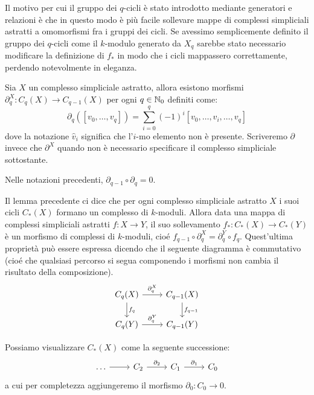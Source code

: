 \begin{rmk}
  Il motivo per cui il gruppo dei $q$-cicli è stato introdotto mediante generatori e relazioni è che in questo modo è più facile sollevare mappe di complessi simpliciali astratti a omomorfismi fra i gruppi dei cicli. Se avessimo semplicemente definito il gruppo dei $q$-cicli come il $k$-modulo generato da $X_q$ sarebbe stato necessario modificare la definizione di $f_*$ in modo che i cicli mappassero correttamente, perdendo notevolmente in eleganza.
\end{rmk}

\begin{defn}
  Sia $X$ un complesso simpliciale astratto, allora esistono morfismi $\partial^X_q:C_q(X) \to C_{q-1}(X)$ per ogni $q\in\mathbb{N}_0$ definiti come:
  \begin{equation*}
    \partial_q([v_0,\dots,v_q])=\sum_{i=0}^q (-1)^i[v_0,\dots,\widehat{v}_i,\dots,v_q]
  \end{equation*}
  dove la notazione $\widehat{v}_i$ significa che l'$i$-mo elemento non è presente. Scriveremo $\partial$ invece che $\partial^X$ quando non è necessario specificare il complesso simpliciale sottostante.
\end{defn}

\begin{lemma}
  Nelle notazioni precedenti, $\partial_{q-1}\circ \partial_q=0$.
\end{lemma}

\begin{rmk}
  Il lemma precedente ci dice che per ogni complesso simpliciale astratto $X$ i suoi cicli $C_*(X)$ formano un complesso di $k$-moduli. Allora data una mappa di complessi simpliciali astratti $f:X\to Y$, il suo sollevamento $f_*:C_*(X)\to C_*(Y)$ è un morfismo di complessi di $k$-moduli, cioé $f_{q-1}\circ \partial^X_q=\partial^Y_q\circ f_q$. Quest'ultima proprietà può essere espressa dicendo che il seguente diagramma è commutativo (cioé che qualsiasi percorso si segua componendo i morfismi non cambia il risultato della composizione).
  \begin{equation*}
    \begin{tikzcd}
      C_q(X)\arrow[r,"\partial^X_q"]\arrow[d,"f_q"]
        &C_{q-1}(X)\arrow[d,"f_{q-1}"]\\
      C_q(Y)\arrow[r,"\partial^Y_q"]&C_{q-1}(Y)
    \end{tikzcd}
  \end{equation*}

  Possiamo visualizzare $C_*(X)$ come la seguente successione:
  \begin{equation*}
    \begin{tikzcd}
      \dots \arrow{r}&
        C_2\arrow{r}{\partial_2}&
          C_1\arrow{r}{\partial_1}&
            C_0
    \end{tikzcd}
  \end{equation*}
  a cui per completezza aggiungeremo il morfismo $\partial_0:C_0\to 0$.
\end{rmk}

